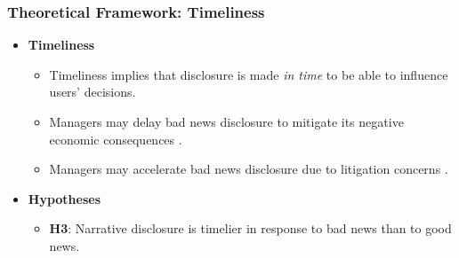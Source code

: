 \documentclass{beamer}
\begin{document}
\begin{frame}
	\frametitle{Theoretical Framework: Timeliness}
	\begin{itemize}
		\item \textbf{Timeliness}
		
		\begin{itemize}
			\item Timeliness implies that disclosure is made \textit{in time} to be able to influence users' decisions. 
			\item Managers may delay bad news disclosure to mitigate its negative economic consequences \citep{chambersTimelinessReportingStock1984, niessnerStrategicDisclosureTiming2015, segalAreManagersStrategic2016, brockbankStrategicTiming8K2018}.
			\item Managers may accelerate bad news disclosure due to litigation concerns \citep{skinnerWhyFirmsVoluntarily1994, marinovicNoNewsGood2016}.
		\end{itemize}
		
		\item \textbf{Hypotheses}
		
		\begin{itemize}
			\item  \textbf{H3}: Narrative disclosure is timelier in response to bad news than to good news.
		\end{itemize}
		
	\end{itemize}
\end{frame}
%
%
%
%
\end{document}
